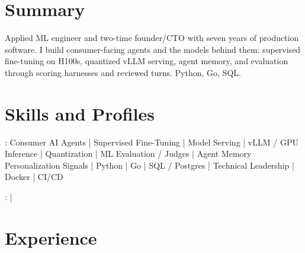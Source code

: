 \documentclass[print]{jack-resume}
\begin{document}
\pagecolor{darkmodeBackground}


\begin{minipage}[t][1cm][t]{.03\textwidth}
    \hfill
\end{minipage}

\section{Summary}
Applied ML engineer and two-time founder/CTO with seven years of production software. I build consumer-facing agents and the models behind them: supervised fine-tuning on H100s, quantized vLLM serving, agent memory, and evaluation through scoring harnesses and reviewed turns. Python, Go, SQL.
\sectionsep

\section{Skills and Profiles}
:
Consumer AI Agents \hfill | \hfill
Supervised Fine-Tuning \hfill | \hfill
Model Serving \hfill | \hfill
vLLM / GPU Inference \hfill | \hfill
Quantization \hfill | \hfill
ML Evaluation / Judges \hfill | \hfill
Agent Memory \\
\hspace{1.0cm} Personalization Signals \hfill | \hfill
Python \hfill | \hfill
Go \hfill | \hfill
SQL / Postgres \hfill | \hfill
Technical Leadership \hfill | \hfill
Docker \hfill | \hfill
CI/CD \\

\raggedright{
    :
      \href{https://www.linkedin.com/in/jack-sturtevant/}{ \ExternalLink} |
     \href{https://github.com/jacksturt}{ \ExternalLink}}

\section{Experience}
\end{document}
